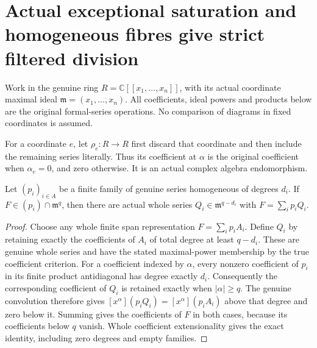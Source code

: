 \section{Actual exceptional saturation and homogeneous fibres give strict filtered division}

Work in the genuine ring $R=\mathbb C[[x_1,\ldots,x_n]]$, with its
actual coordinate maximal ideal $\mathfrak m=(x_1,\ldots,x_n)$.
All coefficients, ideal powers and products below are the original
formal-series operations. No comparison of diagrams in fixed coordinates
is assumed.

\begin{definition}
\label{hir:actual-exceptional-pivot-zero-projection}
\leanok
For a coordinate $e$, let $\rho_e:R\to R$ first discard that coordinate
and then include the remaining series literally. Thus its coefficient
at $\alpha$ is the original coefficient when $\alpha_e=0$, and zero
otherwise. It is an actual complex algebra endomorphism.
\end{definition}

\begin{theorem}
\label{hir:actual-homogeneous-family-shifted-filtered-division}
\leanok
Let $(p_i)_{i\in A}$ be a finite family of genuine series homogeneous
of degrees $d_i$. If $F\in(p_i)\cap\mathfrak m^q$, then there are
actual whole series $Q_i\in\mathfrak m^{q-d_i}$ with
$F=\sum_i p_iQ_i$.
\end{theorem}
\begin{proof}
Choose any whole finite span representation $F=\sum_i p_iA_i$.
Define $Q_i$ by retaining exactly the coefficients of $A_i$ of total
degree at least $q-d_i$. These are genuine whole series and have the
stated maximal-power membership by the true coefficient criterion.
For a coefficient indexed by $\alpha$, every nonzero coefficient of
$p_i$ in its finite product antidiagonal has degree exactly $d_i$.
Consequently the corresponding coefficient of $Q_i$ is retained
exactly when $|\alpha|\ge q$. The genuine convolution therefore gives
$[x^\alpha](p_iQ_i)=[x^\alpha](p_iA_i)$ above that degree and zero below
it. Summing gives the coefficients of $F$ in both cases, because its
coefficients below $q$ vanish. Whole coefficient extensionality gives
the exact identity, including zero degrees and empty families.
\end{proof}

